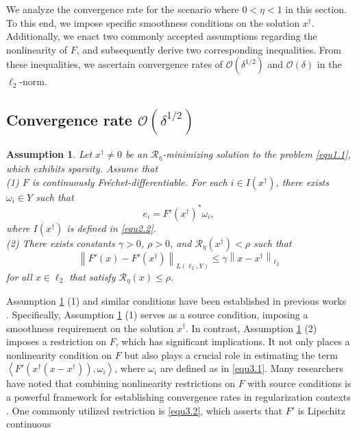 \documentclass[a4paper,12pt]{article}
\newtheorem{assumption}[theorem]{Assumption}
\numberwithin{equation}{section}
\begin{document}
\par We analyze the convergence rate for the scenario where $0<\eta<1$ in this section. To this end, we impose specific smoothness conditions on the solution $x^{\dagger}$. Additionally, we enact two commonly accepted assumptions regarding the nonlinearity of $F$, and subsequently derive two corresponding inequalities. From these inequalities, we ascertain convergence rates of $\mathcal{O}\left(\delta^{1/2}\right)$ and $\mathcal{O}\left(\delta\right)$ in the $\ell_{2}$-norm.

\subsection{Convergence rate $\mathcal{O}\left(\delta^{1/2}\right)$}\label{sec3.1}

\begin{assumption}\label{ass3.1}
    Let $x^{\dagger}\neq 0$ be an $\mathcal{R}_{\eta}$-minimizing solution to the problem \eqref{equ1.1}, which exhibits sparsity. Assume that \\
    (1) $F$ is continuously Fr\'{e}chet-differentiable. For each $i\in I\left(x^{\dagger}\right)$, there exists $\omega_{i}\in Y$ such that
    \begin{equation}\label{equ3.1}
        e_{i} = F'\left(x^{\dagger}\right)^{*}\omega_{i},
    \end{equation}
    where $I\left(x^{\dagger}\right)$ is defined in \eqref{equ2.2}. \\
    (2) There exists constants $\gamma>0$, $\rho>0$, and $\mathcal{R}_{\eta}\left(x^{\dagger}\right)<\rho$ such that
    \begin{equation}\label{equ3.2}
        \left\|F'\left(x\right)-F'\left(x^{\dagger}\right)\right\|_{L\left(\ell_{2}, Y\right)}\leq \gamma\left\|x-x^{\dagger}\right\|_{\ell_{2}}
    \end{equation}
    for all $x\in\ell_{2}$ that satisfy $\mathcal{R}_{\eta}\left(x\right)\leq \rho$.
\end{assumption}

\par Assumption \ref{ass3.1} (1) and similar conditions have been established in previous works \cite{BL09, G09}. Specifically, Assumption \ref{ass3.1} (1) serves as a source condition, imposing a smoothness requirement on the solution $x^{\dagger}$. In contrast, Assumption \ref{ass3.1} (2) imposes a restriction on $F$, which has significant implications. It not only places a nonlinearity condition on $F$ but also plays a crucial role in estimating the term $\left<F'\left(x^{\dagger}\left(x-x^{\dagger}\right)\right),\omega_{i}\right>$, where $\omega_{i}$ are defined as in \eqref{equ3.1}. Many researchers have noted that combining nonlinearity restrictions on $F$ with source conditions is a powerful framework for establishing convergence rates in regularization contexts \cite{GHS08, HKPS07, SKHK12}. One commonly utilized restriction is \eqref{equ3.2}, which asserts that $F'$ is Lipschitz continuous \cite{EHN96, JM12}
\end{document}
